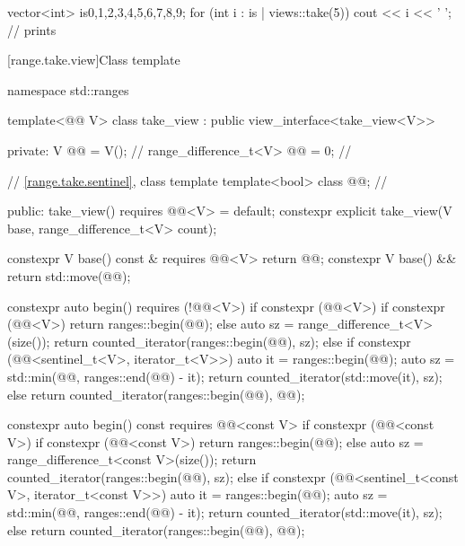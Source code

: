 \pnum
\begin{example}
\begin{codeblock}
vector<int> is{0,1,2,3,4,5,6,7,8,9};
for (int i : is | views::take(5))
  cout << i << ' '; // prints 
\end{codeblock}
\end{example}

[range.take.view]{Class template }

%
%
%
%
%
\begin{codeblock}
namespace std::ranges {
  template<@@ V>
  class take_view : public view_interface<take_view<V>> {
  private:
    V @@ = V();                                      // \expos
    range_difference_t<V> @@ = 0;                   // \expos

    // \ref{range.take.sentinel}, class template 
    template<bool> class @@;                      // \expos

  public:
    take_view() requires @@<V> = default;
    constexpr explicit take_view(V base, range_difference_t<V> count);

    constexpr V base() const & requires @@<V> { return @@; }
    constexpr V base() && { return std::move(@@); }

    constexpr auto begin() requires (!@@<V>) {
      if constexpr (@@<V>) {
        if constexpr (@@<V>) {
          return ranges::begin(@@);
        } else {
          auto sz = range_difference_t<V>(size());
          return counted_iterator(ranges::begin(@@), sz);
        }
      } else if constexpr (@@<sentinel_t<V>, iterator_t<V>>) {
        auto it = ranges::begin(@@);
        auto sz = std::min(@@, ranges::end(@@) - it);
        return counted_iterator(std::move(it), sz);
      } else {
        return counted_iterator(ranges::begin(@@), @@);
      }
    }

    constexpr auto begin() const requires @@<const V> {
      if constexpr (@@<const V>) {
        if constexpr (@@<const V>) {
          return ranges::begin(@@);
        } else {
          auto sz = range_difference_t<const V>(size());
          return counted_iterator(ranges::begin(@@), sz);
        }
      } else if constexpr (@@<sentinel_t<const V>, iterator_t<const V>>) {
        auto it = ranges::begin(@@);
        auto sz = std::min(@@, ranges::end(@@) - it);
        return counted_iterator(std::move(it), sz);
      } else {
        return counted_iterator(ranges::begin(@@), @@);
      }
    }

}}
\end{codeblock}
